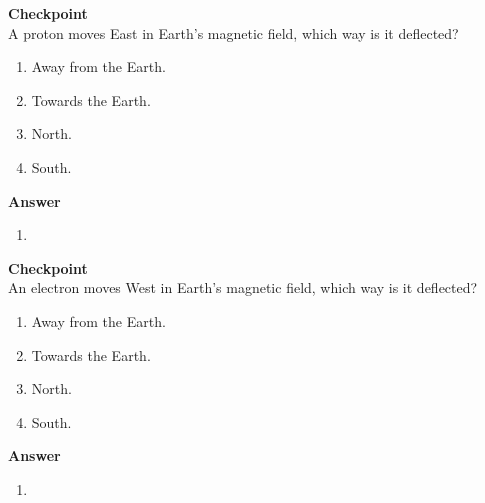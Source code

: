 \begin{framed}
\textbf{Checkpoint}\\
A proton moves East in Earth's magnetic field, which way is it deflected?

\begin{enumerate}
\item Away from the Earth.
\item Towards the Earth.
\item North.
\item South.
\end{enumerate}

\begin{framed}
\textbf{Answer}\\
\begin{enumerate}
\item
\end{enumerate}
\end{framed}
\end{framed}

\begin{framed}
\textbf{Checkpoint}\\
An electron moves West in Earth's magnetic field, which way is it deflected?

\begin{enumerate}
\item Away from the Earth.
\item Towards the Earth.
\item North.
\item South.
\end{enumerate}

\begin{framed}
\textbf{Answer}\\
\begin{enumerate}
\item
\end{enumerate}
\end{framed}
\end{framed}

